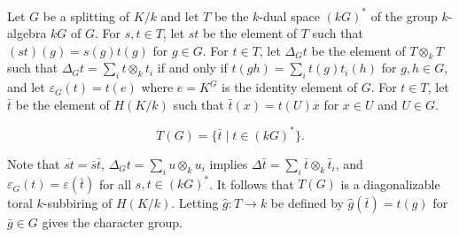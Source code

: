 Let $G$ be a splitting of $K/k$ and let $T$ be the $k$-dual space $(kG)^*$ of the group $k$-algebra $kG$ of $G$. For $s, t \in T$, let $st$ be the element of $T$ such that $(st)(g) = s(g)t(g)$ for $g \in G$. For $t \in T$, let $\Delta_G t$ be the element of $T \otimes_k T$ such that $\Delta_G t = \sum_i t \otimes_k t_i$ if and only if $t(gh) = \sum_i t(g)t_i(h)$ for $g, h \in G$, and let $\varepsilon_G(t) = t(e)$ where $e = K^G$ is the identity element of $G$. For $t \in T$, let $\bar{t}$ be the element of $H(K/k)$ such that $\bar{t}(x) = t(U)x$ for $x \in U$ and $U \in G$.

$$
T(G) = \{ \bar{t} \mid t \in (kG)^* \}.
$$

Note that $\overline{st} = \bar{s}\bar{t}$, $\Delta_G t = \sum_i u \otimes_k u_i$ implies $\Delta \bar{t} = \sum_i \bar{t} \otimes_k \bar{t}_i$, and $\varepsilon_G(t) = \varepsilon(\bar{t})$ for all $s, t \in (kG)^*$. It follows that $T(G)$ is a diagonalizable toral $k$-subbiring of $H(K/k)$. Letting $\hat{g}: T \to k$ be defined by $\hat{g}(\bar{t}) = t(g)$ for $\bar{g} \in G$ gives the character group.
